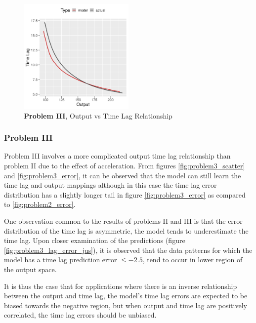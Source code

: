 \documentclass[envcountsect,runningheads]{llncs}
\theoremstyle{etoile}
\begin{document}
\begin{figure}[h]
\vspace{.3in}
\centerline{\includegraphics[width=0.5\textwidth]{figures/exp3_predictive_curves.png}}
\vspace{.3in}
\caption{\textbf{Problem III}, Output vs Time Lag Relationship}
\label{fig:problem3_curves}
\end{figure}


\subsubsection{Problem III}

Problem III involves a more complicated output time lag relationship than problem II due to the 
effect of acceleration. From figures \ref{fig:problem3_scatter} and \ref{fig:problem3_error}, 
it can be observed that the model can still learn the time lag and output mappings although 
in this case the time lag error distribution has a slightly longer tail in figure 
\ref{fig:problem3_error} as compared to \ref{fig:problem2_error}.

One observation common to the results of problems II and III is that the error distribution of 
the time lag is asymmetric, the model tends to underestimate the time lag. Upon closer examination 
of the predictions (figure \ref{fig:problem3_lag_error_jus}), it is observed that the data patterns 
for which the model has a time lag prediction error $\leq -2.5$, tend to occur in lower region of 
the output space. %

It is thus the case that for applications where there is an inverse relationship between the output 
and time lag, the model's time lag errors are expected to be biased towards the negative region, 
but when output and time lag are positively correlated, the time lag errors should be unbiased.
\end{document}
